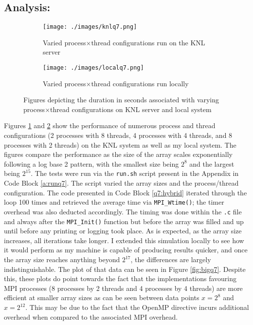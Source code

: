 \documentclass[11pt]{article}
\begin{document}
\subsection*{Analysis:}

\begin{figure}[H]
\centering
\begin{subfigure}[t]{0.48\textwidth}
  \centering
    \texttt{[image: ./images/knlq7.png]}
  \caption{Varied process$\times$thread configurations run on the KNL server}\label{fig:knlq7}
\end{subfigure}%
\hfill
\begin{subfigure}[t]{0.48\textwidth}
  \centering
    \texttt{[image: ./images/localq7.png]}
  \caption{Varied process$\times$thread configurations run locally}\label{fig:localq7}
\end{subfigure}%
\caption{Figures depicting the duration in seconds associated with varying process$\times$thread configurations on KNL server and local system}
\label{fig:gq7}
\end{figure}

Figures \ref{fig:knlq7} and \ref{fig:localq7} show the performance of numerous process and thread configurations (2 processes with 8 threads, 4 processes with 4 threads, and 8 processes with 2 threads) on the KNL system as well as my local system.
The figures compare the performance as the size of the array scales exponentially following a log base 2 pattern, with the smallest size being $2^8$ and the largest being $2^{15}$.
The tests were run via the \texttt{run.sh} script present in the Appendix in Code Block \ref{a:runq7}.
The script varied the array sizes and the process/thread configuration.
The code presented in Code Block \ref{q7:hybrid} iterated through the loop 100 times and retrieved the average time via \texttt{MPI\_Wtime()}; the timer overhead was also deducted accordingly.
The timing was done within the \texttt{.c} file and always after the \texttt{MPI\_Init()} function but before the array was filled and up until before any printing or logging took place.
As is expected, as the array size increases, all iterations take longer.
I extended this simulation locally to see how it would perform as my machine is capable of producing results quicker, and once the array size reaches anything beyond $2^{17}$, the differences are largely indistinguishable.
The plot of that data can be seen in Figure \ref{fig:bigq7}.
Despite this, these plots do point towards the fact that the implementations favouring MPI processes (8 processes by 2 threads and 4 processes by 4 threads) are more efficient at smaller array sizes as can be seen between data points $x=2^8$ and $x=2^{12}$.
This may be due to the fact that the OpenMP directive incurs additional overhead when compared to the associated MPI overhead.
\end{document}
